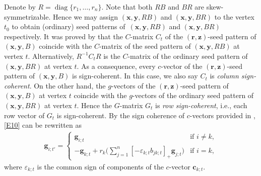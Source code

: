 \documentclass[11pt]{article}
\numberwithin{equation}{section}
\numberwithin{equation}{section}
\begin{document}
Denote by $R=\operatorname{diag}\{r_1,\dots,r_n\}$. Note that both $RB$ and $BR$ are skew-symmetrizable. Hence we may assign $(\mathbf{x},\mathbf{y}, RB)$ and $(\mathbf{x},\mathbf{y},BR)$ to the vertex $t_0$ to obtain (ordinary) seed patterns of~$(\mathbf{x},\mathbf{y}, RB)$ and $(\mathbf{x},\mathbf{y},BR)$ respectively.
It was proved by \cite[Proposition 3.9]{Nakanishi14} that the $C$-matrix $C_t$ of the $(\mathbf{r},\mathbf{z})$-seed pattern of $(\mathbf{x},\mathbf{y}, B)$ coincide with the $C$-matrix of the seed pattern of $(\mathbf{x},\mathbf{y}, RB)$ at vertex $t$. Alternatively, $R^{-1}C_tR$ is the $C$-matrix of the ordinary seed pattern of $(\mathbf{x},\mathbf{y}, BR)$ at vertex $t$. As a consequence, every $c$-vector of the $(\mathbf{r},\mathbf{z})$-seed pattern of $(\mathbf{x},\mathbf{y}, B)$ is sign-coherent. In this case, we also say $C_t$ is {\it column sign-coherent}. On the other hand, the $g$-vectors of the $(\mathbf{r},\mathbf{z})$-seed pattern of $(\mathbf{x},\mathbf{y}, B)$ at vertex $t$ coincide with the $g$-vectors of the ordinary seed pattern of $(\mathbf{x},\mathbf{y},BR)$ at vertex $t$. Hence the $G$-matrix $G_t$ is {\it row sign-coherent}, i.e., each row vector of $G_t$ is sign-coherent.
By the sign coherence of $c$-vectors provided in \cite[Corollary 5.5]{GHKK2018}, \eqref{E10} can be rewritten as
\begin{align}\label{E15}
\mathbf{g}_{i;t'}=\begin{cases}\mathbf{g}_{i;t}& \text{if $i\neq k$},\\
 \displaystyle-\mathbf{g}_{k;t}+r_k\biggl(\sum\limits_{j=1}^{n}[-\varepsilon_{k;t} b_{jk;t}]_+\mathbf{g}_{j;t}\biggr)& \text{if $i=k$},
 \end{cases}
\end{align}
where $\varepsilon_{k;t}$ is the common sign of components of the $c$-vector $\mathbf{c}_{k;t}$.
\end{document}

